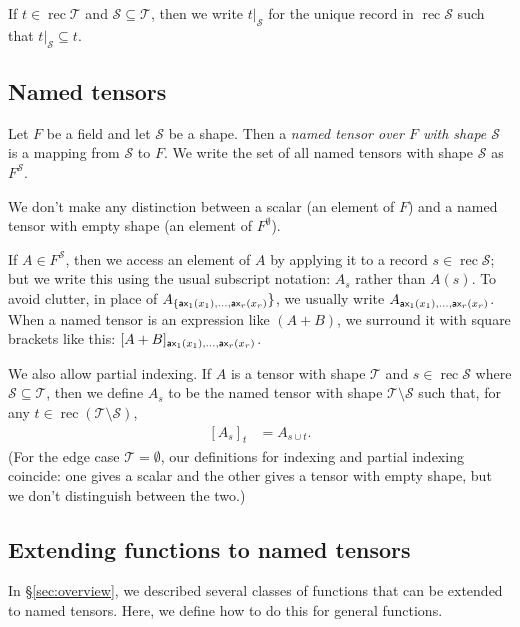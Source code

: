 \documentclass{article}
\DeclareMathOperator{\rec}{rec}
\newcommand{\restrict}[2]{\left.#1\right|_{#2}}
\begin{document}
If $t \in \rec \mathcal{T}$ and $\mathcal{S} \subseteq \mathcal{T}$, then we write $\restrict{t}{\mathcal{S}}$ for the unique record in $\rec \mathcal{S}$ such that $\restrict{t}{\mathcal{S}} \subseteq t$.

\subsection{Named tensors}

Let $F$ be a field and let $\mathcal{S}$ be a shape. Then a \emph{named tensor over $F$ with shape $\mathcal{S}$} is a mapping from $\mathcal{S}$ to $F$. We write the set of all named tensors with shape $\mathcal{S}$ as $F^{\mathcal{S}}$.

We don't make any distinction between a scalar (an element of $F$) and a named tensor with empty shape (an element of $F^\emptyset$).

If $A \in F^{\mathcal{S}}$, then we access an element of $A$ by applying it to a record $s \in \rec \mathcal{S}$; but we write this using the usual subscript notation: $A_s$ rather than $A(s)$. To avoid clutter, in place of $A_{\{\mathsf{ax_\text{$1$}}(x_1), \ldots, \mathsf{ax_\text{$r$}}(x_r)}\}$, we usually write $A_{\mathsf{ax_\text{$1$}}(x_1), \ldots, \mathsf{ax_\text{$r$}}(x_r)}$. When a named tensor is an expression like $(A+B)$, we surround it with square brackets like this: $[A+B]_{\mathsf{ax_\text{$1$}}(x_1), \ldots, \mathsf{ax_\text{$r$}}(x_r)}$.

We also allow partial indexing. If $A$ is a tensor with shape $\mathcal{T}$ and $s \in \rec \mathcal{S}$ where $\mathcal{S} \subseteq \mathcal{T}$, then we define $A_s$ to be the named tensor with shape $\mathcal{T} \setminus \mathcal{S}$ such that, for any $t \in \rec (\mathcal{T} \setminus \mathcal{S})$,
\begin{align*}
\left[A_s\right]_t &= A_{s \cup t}.
\end{align*}
(For the edge case $\mathcal{T} = \emptyset$, our definitions for indexing and partial indexing coincide: one gives a scalar and the other gives a tensor with empty shape, but we don't distinguish between the two.)

\subsection{Extending functions to named tensors}
\label{sec:tensorfunctions}

In \S\ref{sec:overview}, we described several classes of functions that can be extended to named tensors. Here, we define how to do this for general functions.
\end{document}
